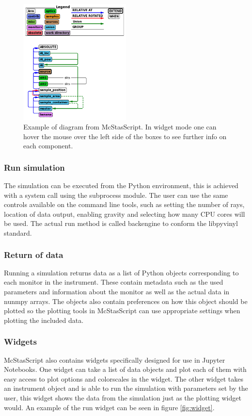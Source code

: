 \documentclass[11pt, a4paper]{article}
\begin{document}
\begin{figure}[h!!!]
\centering
\includegraphics[width=0.5\textwidth]{figures/diagram_example.png}
\caption{\label{fig:diagram}Example of diagram from McStasScript. In widget mode one can hover the mouse over the left side of the boxes to see further info on each component.}
\end{figure}

\subsubsection{Run simulation}
The simulation can be executed from the Python environment, this is achieved with a system call using the subprocess module. The user can use the same controls available on the command line tools, such as setting the number of rays, location of data output, enabling gravity and selecting how many CPU cores will be used. The actual run method is called backengine to conform the libpyvinyl standard.

\subsubsection{Return of data}
Running a simulation returns data as a list of Python objects corresponding to each monitor in the instrument. These contain metadata such as the used parameters and information about the monitor as well as the actual data in nunmpy arrays. The objects also contain preferences on how this object should be plotted so the plotting tools in McStasScript can use appropriate settings when plotting the included data. 

\subsubsection{Widgets}
McStasScript also contains widgets specifically designed for use in Jupyter Notebooks. One widget can take a list of data objects and plot each of them with easy access to plot options and colorscales in the widget. The other widget takes an instrument object and is able to run the simulation with parameters set by the user, this widget shows the data from the simulation just as the plotting widget would. An example of the run widget can be seen in figure \ref{fig:widget}.
\end{document}
